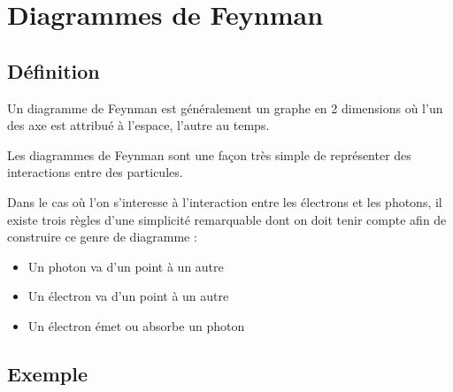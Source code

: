 \chapter{Diagrammes de Feynman}

\label{JeanLucDeziel}

\section{Définition}

Un diagramme de Feynman est généralement un graphe en 2 dimensions où l'un des axe est attribué à l'espace, l'autre au temps.

Les diagrammes de Feynman sont une façon très simple de représenter des interactions entre des particules. \cite{diagrammesFeynman}

Dans le cas où l'on s'interesse à l'interaction entre les électrons et les photons, il existe trois règles d'une simplicité remarquable dont on doit tenir compte afin de construire ce genre de diagramme :
\begin{itemize}[leftmargin=1cm, label=, itemsep=1pt]
\item Un photon va d'un point à un autre
\item Un électron va d'un point à un autre
\item Un électron émet ou absorbe un photon
\end{itemize}

\section{Exemple}


